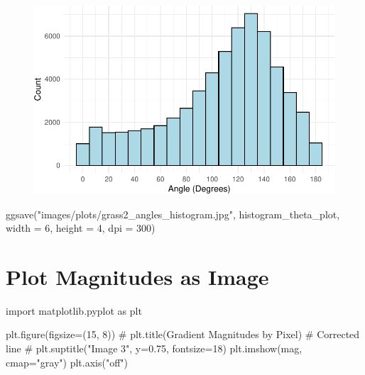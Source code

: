 \documentclass[
  letterpaper,
  DIV=11,
  numbers=noendperiod]{scrreprt}
\newenvironment{Shaded}{\begin{snugshade}}{\end{snugshade}}
\newcommand{\AttributeTok}[1]{\textcolor[rgb]{0.40,0.45,0.13}{#1}}
\newcommand{\CommentTok}[1]{\textcolor[rgb]{0.37,0.37,0.37}{#1}}
\newcommand{\DecValTok}[1]{\textcolor[rgb]{0.68,0.00,0.00}{#1}}
\newcommand{\FunctionTok}[1]{\textcolor[rgb]{0.28,0.35,0.67}{#1}}
\newcommand{\ImportTok}[1]{\textcolor[rgb]{0.00,0.46,0.62}{#1}}
\newcommand{\NormalTok}[1]{\textcolor[rgb]{0.00,0.23,0.31}{#1}}
\newcommand{\OperatorTok}[1]{\textcolor[rgb]{0.37,0.37,0.37}{#1}}
\newcommand{\StringTok}[1]{\textcolor[rgb]{0.13,0.47,0.30}{#1}}
\begin{document}
\begin{figure}[H]

{\centering \includegraphics{results_files/figure-pdf/unnamed-chunk-7-2.pdf}

}

\end{figure}

\begin{Shaded}
\begin{Highlighting}[]
\FunctionTok{ggsave}\NormalTok{(}\StringTok{"images/plots/grass2\_angles\_histogram.jpg"}\NormalTok{, histogram\_theta\_plot, }\AttributeTok{width =} \DecValTok{6}\NormalTok{, }\AttributeTok{height =} \DecValTok{4}\NormalTok{, }\AttributeTok{dpi =} \DecValTok{300}\NormalTok{)}
\end{Highlighting}
\end{Shaded}

\hypertarget{plot-magnitudes-as-image}{%
\section{Plot Magnitudes as Image}\label{plot-magnitudes-as-image}}

\begin{Shaded}
\begin{Highlighting}[]
\ImportTok{import}\NormalTok{ matplotlib.pyplot }\ImportTok{as}\NormalTok{ plt}

\NormalTok{plt.figure(figsize}\OperatorTok{=}\NormalTok{(}\DecValTok{15}\NormalTok{, }\DecValTok{8}\NormalTok{))}
\CommentTok{\# plt.title(\textquotesingle{}Gradient Magnitudes by Pixel\textquotesingle{})  \# Corrected line}
\CommentTok{\# plt.suptitle("Image 3", y=0.75, fontsize=18)}
\NormalTok{plt.imshow(mag, cmap}\OperatorTok{=}\StringTok{"gray"}\NormalTok{)}
\NormalTok{plt.axis(}\StringTok{"off"}\NormalTok{)}
\end{Highlighting}
\end{Shaded}
\end{document}

